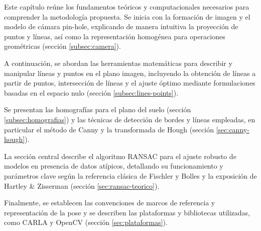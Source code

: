 Este capítulo reúne los fundamentos teóricos y computacionales necesarios para comprender la metodología propuesta. Se inicia con la formación de imagen y el modelo de cámara pin-hole, explicando de manera intuitiva la proyección de puntos y líneas, así como la representación homogénea para operaciones geométricas (sección \ref{subsec:camera}).

A continuación, se abordan las herramientas matemáticas para describir y manipular líneas y puntos en el plano imagen, incluyendo la obtención de líneas a partir de puntos, intersección de líneas y el ajuste óptimo mediante formulaciones basadas en el espacio nulo (sección \ref{subsec:lines-points}).

Se presentan las homografías para el plano del suelo (sección \ref{subsec:homografias}) y las técnicas de detección de bordes y líneas empleadas, en particular el método de Canny y la transformada de Hough (sección \ref{sec:canny-hough}).

La sección central describe el algoritmo RANSAC para el ajuste robusto de modelos en presencia de datos atípicos, detallando su funcionamiento y parámetros clave según la referencia clásica de Fischler y Bolles y la exposición de Hartley \& Zisserman (sección \ref{sec:ransac-teorico}).

Finalmente, se establecen las convenciones de marcos de referencia y representación de la pose y se describen las plataformas y bibliotecas utilizadas, como CARLA y OpenCV (sección \ref{sec:plataformas}).
